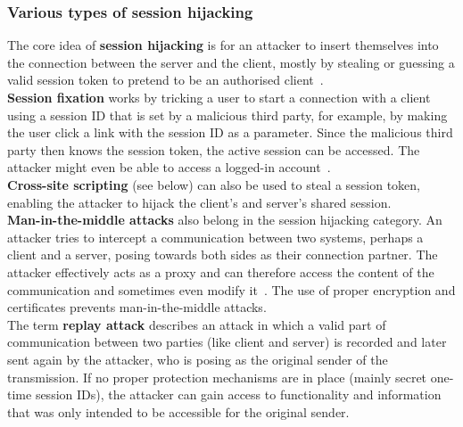 \documentclass[
a4paper,
pagesize,
pdftex,
12pt,
ngerman,
fleqn,
final,
]{scrartcl}
\begin{document}
	
	\subsubsection{Various types of session hijacking}
	The core idea of \textbf{session hijacking} is for an attacker to insert themselves into the connection between the server and the client, mostly by stealing or guessing a valid session token to pretend to be an authorised client~\cite{OWASPFoundation.14.8.2014}.\\
	\textbf{Session fixation} works by tricking a user to start a connection with a client using a session ID that is set by a malicious third party, for example, by making the user click a link with the session ID as a parameter. Since the malicious third party then knows the session token, the active session can be accessed. The attacker might even be able to access a logged-in account~\cite{OWASPFoundation.14.8.2014}.\\
	\textbf{Cross-site scripting} (see below) can also be used to steal a session token, enabling the attacker to hijack the client's and server's shared session.\\
	\textbf{Man-in-the-middle attacks} also belong in the session hijacking category. An attacker tries to intercept a communication between two systems, perhaps a client and a server, posing towards both sides as their connection partner. The attacker effectively acts as a proxy and can therefore access the content of the communication and sometimes even modify it~\cite{OWASPFoundation.31.8.2015}. The use of proper encryption and certificates prevents man-in-the-middle attacks.\\
	The term \textbf{replay attack} describes an attack in which a valid part of communication between two parties (like client and server) is recorded and later sent again by the attacker, who is posing as the original sender of the transmission. If no proper protection mechanisms are in place (mainly secret one-time session IDs), the attacker can gain access to functionality and information that was only intended to be accessible for the original sender.
	
\end{document}
